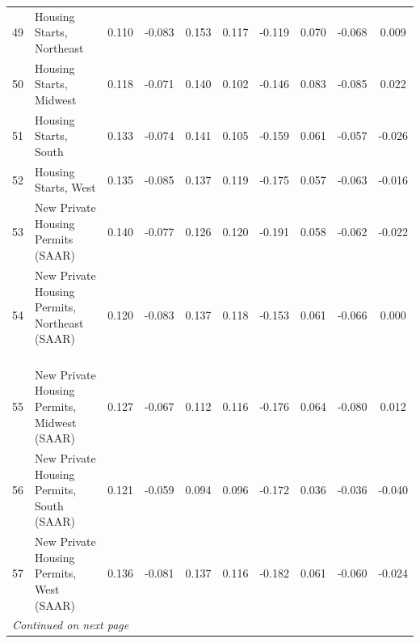 \begin{table}[!h]
\begin{tabular}{llcccccccc}
49&Housing Starts, Northeast	&	0.110	&	-0.083	&	0.153	&	0.117	&	-0.119	&	0.070	&	-0.068	&	0.009	\\
50&Housing Starts, Midwest	&	0.118	&	-0.071	&	0.140	&	0.102	&	-0.146	&	0.083	&	-0.085	&	0.022	\\
51&Housing Starts, South	&	0.133	&	-0.074	&	0.141	&	0.105	&	-0.159	&	0.061	&	-0.057	&	-0.026	\\
52&Housing Starts, West	&	0.135	&	-0.085	&	0.137	&	0.119	&	-0.175	&	0.057	&	-0.063	&	-0.016	\\
53&New Private Housing Permits (SAAR)	&	0.140	&	-0.077	&	0.126	&	0.120	&	-0.191	&	0.058	&	-0.062	&	-0.022	\\
54&New Private Housing Permits, Northeast (SAAR) $\hspace{20pt} $	&	0.120	&	-0.083	&	0.137	&	0.118	&	-0.153	&	0.061	&	-0.066	&	0.000	\\
55&New Private Housing Permits, Midwest (SAAR)	&	0.127	&	-0.067	&	0.112	&	0.116	&	-0.176	&	0.064	&	-0.080	&	0.012	\\
56&New Private Housing Permits, South (SAAR)	&	0.121	&	-0.059	&	0.094	&	0.096	&	-0.172	&	0.036	&	-0.036	&	-0.040	\\
57&New Private Housing Permits, West (SAAR)	&	0.136	&	-0.081	&	0.137	&	0.116	&	-0.182	&	0.061	&	-0.060	&	-0.024	\\
 \hline
\multicolumn{10}{l}{\it Continued on next page}
    \end{tabular}

\end{table}

